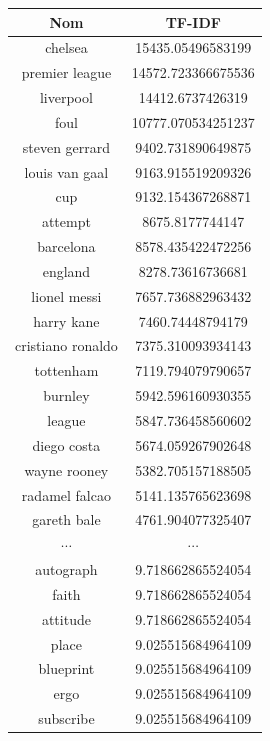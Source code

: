 \documentclass[a4paper, 12pt]{article}
\begin{document}
\newpage
\begin{figure}[h!]
\begin{center}
 \begin{tabular}{|c|c|}
 \hline
  \textbf{Nom} & \textbf{TF-IDF} \\
  \hline
  chelsea  & 15435.05496583199 \\
  premier league  & 14572.723366675536 \\
  liverpool  & 14412.6737426319 \\
  foul  & 10777.070534251237 \\
  steven gerrard  & 9402.731890649875 \\
  louis van gaal  & 9163.915519209326 \\
  cup  & 9132.154367268871 \\
  attempt  & 8675.8177744147 \\
  barcelona  & 8578.435422472256 \\
  england  & 8278.73616736681 \\
  lionel messi  & 7657.736882963432 \\
  harry kane  & 7460.74448794179 \\
  cristiano ronaldo  & 7375.310093934143 \\
  tottenham  & 7119.794079790657 \\
  burnley  & 5942.596160930355 \\
  league  & 5847.736458560602 \\
  diego costa  & 5674.059267902648 \\
  wayne rooney  & 5382.705157188505 \\
  radamel falcao  & 5141.135765623698 \\
  gareth bale  & 4761.904077325407 \\
 $\cdots$ & $\cdots$ \\
  autograph  & 9.718662865524054 \\
  faith  & 9.718662865524054 \\
  attitude  & 9.718662865524054 \\
  place  & 9.025515684964109 \\
  blueprint  & 9.025515684964109 \\
  ergo  & 9.025515684964109 \\
  subscribe  & 9.025515684964109 \\

\end{tabular}
\end{center}
\end{figure}
\end{document}
